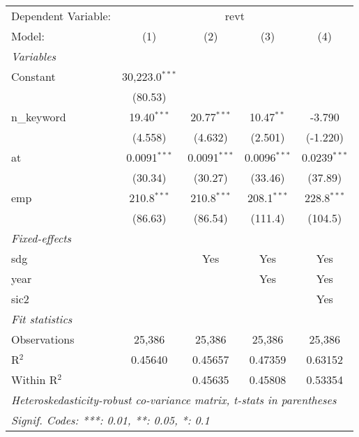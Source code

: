 
\begingroup
\centering
\begin{tabular}{lcccc}
   \tabularnewline \midrule \midrule
   Dependent Variable: & \multicolumn{4}{c}{revt}\\
   Model:       & (1)              & (2)            & (3)            & (4)\\  
   \midrule
   \emph{Variables}\\
   Constant     & 30,223.0$^{***}$ &                &                &   \\   
                & (80.53)          &                &                &   \\   
   n\_keyword   & 19.40$^{***}$    & 20.77$^{***}$  & 10.47$^{**}$   & -3.790\\   
                & (4.558)          & (4.632)        & (2.501)        & (-1.220)\\   
   at           & 0.0091$^{***}$   & 0.0091$^{***}$ & 0.0096$^{***}$ & 0.0239$^{***}$\\   
                & (30.34)          & (30.27)        & (33.46)        & (37.89)\\   
   emp          & 210.8$^{***}$    & 210.8$^{***}$  & 208.1$^{***}$  & 228.8$^{***}$\\   
                & (86.63)          & (86.54)        & (111.4)        & (104.5)\\   
   \midrule
   \emph{Fixed-effects}\\
   sdg          &                  & Yes            & Yes            & Yes\\  
   year         &                  &                & Yes            & Yes\\  
   sic2         &                  &                &                & Yes\\  
   \midrule
   \emph{Fit statistics}\\
   Observations & 25,386           & 25,386         & 25,386         & 25,386\\  
   R$^2$        & 0.45640          & 0.45657        & 0.47359        & 0.63152\\  
   Within R$^2$ &                  & 0.45635        & 0.45808        & 0.53354\\  
   \midrule \midrule
   \multicolumn{5}{l}{\emph{Heteroskedasticity-robust co-variance matrix, t-stats in parentheses}}\\
   \multicolumn{5}{l}{\emph{Signif. Codes: ***: 0.01, **: 0.05, *: 0.1}}\\
\end{tabular}
\par\endgroup


